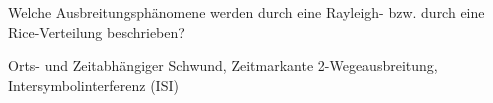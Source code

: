 \begin{question}[section=13,name={Ausbreitungsphänomene},difficulty=,quantity=,type=thr,tags={20131024,20130724}]
	Welche Ausbreitungsphänomene werden durch eine Rayleigh- bzw. durch eine Rice-Verteilung beschrieben?
	
	
\end{question}
\begin{solution}
	Orts- und Zeitabhängiger Schwund, Zeitmarkante 2-Wegeausbreitung, Intersymbolinterferenz (ISI)
\end{solution}